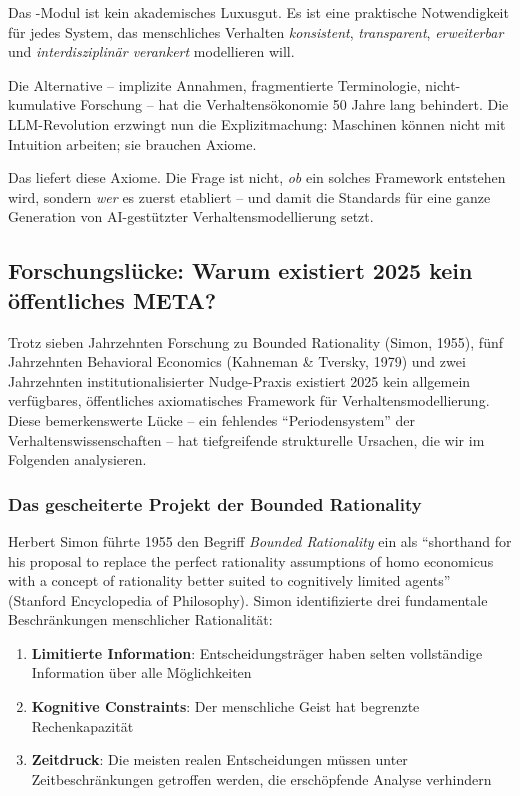 Das \META-Modul ist kein akademisches Luxusgut. Es ist eine praktische Notwendigkeit für jedes System, das menschliches Verhalten \textit{konsistent}, \textit{transparent}, \textit{erweiterbar} und \textit{interdisziplinär verankert} modellieren will.

Die Alternative -- implizite Annahmen, fragmentierte Terminologie, nicht-kumulative Forschung -- hat die Verhaltensökonomie 50 Jahre lang behindert. Die LLM-Revolution erzwingt nun die Explizitmachung: Maschinen können nicht mit Intuition arbeiten; sie brauchen Axiome.

Das \BCM{} liefert diese Axiome. Die Frage ist nicht, \textit{ob} ein solches Framework entstehen wird, sondern \textit{wer} es zuerst etabliert -- und damit die Standards für eine ganze Generation von AI-gestützter Verhaltensmodellierung setzt.


\subsection{Forschungslücke: Warum existiert 2025 kein öffentliches META?}

Trotz sieben Jahrzehnten Forschung zu Bounded Rationality (Simon, 1955), fünf Jahrzehnten Behavioral Economics (Kahneman \& Tversky, 1979) und zwei Jahrzehnten institutionalisierter Nudge-Praxis existiert 2025 kein allgemein verfügbares, öffentliches axiomatisches Framework für Verhaltensmodellierung. Diese bemerkenswerte Lücke -- ein fehlendes ``Periodensystem'' der Verhaltenswissenschaften -- hat tiefgreifende strukturelle Ursachen, die wir im Folgenden analysieren.

\subsubsection{Das gescheiterte Projekt der Bounded Rationality}

Herbert Simon führte 1955 den Begriff \textit{Bounded Rationality} ein als ``shorthand for his proposal to replace the perfect rationality assumptions of homo economicus with a concept of rationality better suited to cognitively limited agents'' (Stanford Encyclopedia of Philosophy). Simon identifizierte drei fundamentale Beschränkungen menschlicher Rationalität:

\begin{enumerate}[label=(\roman*)]
    \item \textbf{Limitierte Information}: Entscheidungsträger haben selten vollständige Information über alle Möglichkeiten
    \item \textbf{Kognitive Constraints}: Der menschliche Geist hat begrenzte Rechenkapazität
    \item \textbf{Zeitdruck}: Die meisten realen Entscheidungen müssen unter Zeitbeschränkungen getroffen werden, die erschöpfende Analyse verhindern
\end{enumerate}

